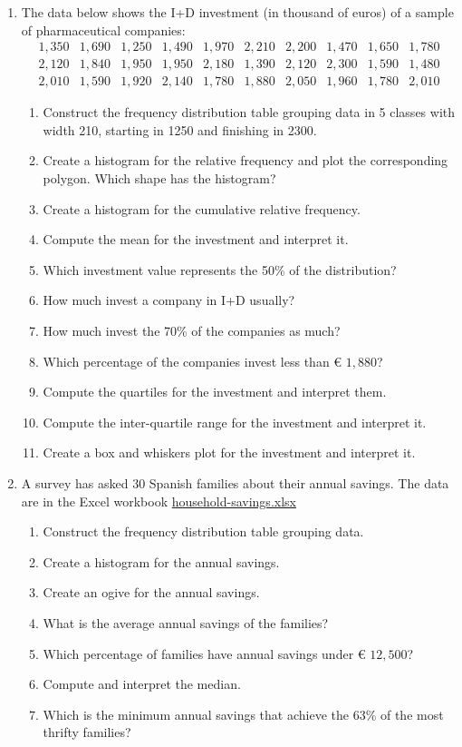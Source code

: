 \begin{enumerate}[leftmargin=*,resume]
\item The data below shows the I+D investment (in thousand of euros) of a sample of pharmaceutical companies:
\[
\begin{array}{rrrrrrrrrr}
1,350 & 1,690 & 1,250 & 1,490 & 1,970 & 2,210 & 2,200 & 1,470 & 1,650 & 1,780 \\
2,120 & 1,840 & 1,950 & 1,950 & 2,180 & 1,390 & 2,120 & 2,300 & 1,590 & 1,480 \\
2,010 & 1,590 & 1,920 & 2,140 & 1,780 & 1,880 & 2,050 & 1,960 & 1,780 & 2,010 
\end{array}
\]

\begin{enumerate}
\item Construct the frequency distribution table grouping data in 5 classes with width 210, starting in 1250 and
finishing in 2300.
\item Create a histogram for the relative frequency and plot the corresponding polygon.  
Which shape has the histogram?
\item Create a histogram for the cumulative relative frequency. 
\item Compute the mean for the investment and interpret it. 
\item Which investment value represents the 50\% of the distribution?
\item How much invest a company in I+D usually?
\item How much invest the 70\% of the companies as much?
\item Which percentage of the companies invest less than € $1,880$?
\item Compute the quartiles for the investment and interpret them. 
\item Compute the inter-quartile range for the investment and interpret it. 
\item Create a box and whiskers plot for the investment and interpret it. 
\end{enumerate}


\item A survey has asked 30 Spanish families about their annual savings. 
The data are in the Excel workbook
\href{http://aprendeconalf.es/office/excel/exercises/databases/household-savings.xlsx}{\textsf{household-savings.xlsx}}

\begin{enumerate}
\item Construct the frequency distribution table grouping data. 
\item Create a histogram for the annual savings. 
\item Create an ogive for the annual savings. 
\item What is the average annual savings of the families?
\item Which percentage of families have annual savings under € $12,500$?
\item Compute and interpret the median. 
\item Which is the minimum annual savings that achieve the 63\% of the most thrifty families?
\end{enumerate}



\end{enumerate}